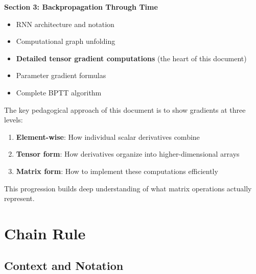 \begin{notechapter}
\textbf{Section 3: Backpropagation Through Time}
\begin{itemize}[leftmargin=*,itemsep=0pt]
    \item RNN architecture and notation
    \item Computational graph unfolding
    \item \textbf{Detailed tensor gradient computations} (the heart of this document)
    \item Parameter gradient formulas
    \item Complete BPTT algorithm
\end{itemize}

\begin{keyinsight}
The key pedagogical approach of this document is to show gradients at three
levels:
\begin{enumerate}
    \item \textbf{Element-wise}: How individual scalar derivatives combine
    \item \textbf{Tensor form}: How derivatives organize into higher-dimensional arrays
    \item \textbf{Matrix form}: How to implement these computations efficiently
\end{enumerate}
This progression builds deep understanding of what matrix operations actually
represent.
\end{keyinsight}

\section{Chain Rule}

\subsection{Context and Notation}


\end{notechapter}
